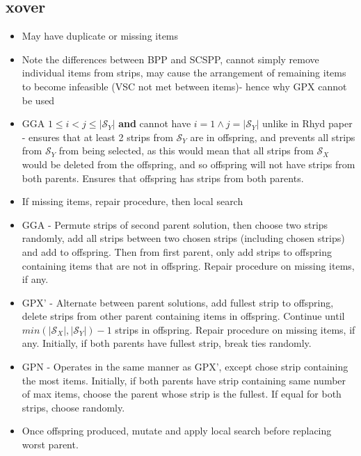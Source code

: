 \documentclass{elsarticle}
\begin{document}
\subsection{xover}
\begin{itemize}
	\item May have duplicate or missing items
	\item Note the differences between BPP and SCSPP, cannot simply remove individual items from strips, may cause the arrangement of remaining items to become infeasible (VSC not met between items)- hence why GPX cannot be used \cite{lewis2017}
	\item GGA $1 \leq i < j \leq |\mathcal{S}_Y|$ \textbf{and} cannot have $i = 1 \land j = |\mathcal{S}_Y|$ unlike in Rhyd paper - ensures that at least 2 strips from $\mathcal{S}_Y$ are in offspring, and prevents all strips from $\mathcal{S}_Y$ from being selected, as this would mean that all strips from $\mathcal{S}_X$ would be deleted from the offspring, and so offspring will not have strips from both parents. Ensures that offspring has strips from both parents.
	\item If missing items, repair procedure, then local search
	\item GGA - Permute strips of second parent solution, then choose two strips randomly, add all strips between two chosen strips (including chosen strips) and add to offspring. Then from first parent, only add strips to offspring containing items that are not in offspring. Repair procedure on missing items, if any.
	\item GPX' - Alternate between parent solutions, add fullest strip to offspring, delete strips from other parent containing items in offspring. Continue until $min(|\mathcal{S}_X|,|\mathcal{S}_Y|)-1$ strips in offspring. Repair procedure on missing items, if any. Initially, if both parents have fullest strip, break ties randomly.
	\item GPN - Operates in the same manner as GPX', except chose strip containing the most items. Initially, if both parents have strip containing same number of max items, choose the parent whose strip is the fullest. If equal for both strips, choose randomly.
	\item Once offspring produced, mutate and apply local search before replacing worst parent.
\end{itemize}
\end{document}
